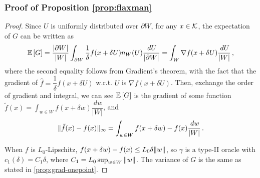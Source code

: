 
\subsubsection*{Proof of Proposition \ref{prop:flaxman}}
\begin{proof}
Since $U$ is uniformly distributed over $\partial W$, for any $x \in \mathcal{K}$, the expectation of $G$ can be written as
\begin{align*}
\mathbb{E}\left[G\right] =\dfrac{\lvert \partial W\rvert}{\lvert W \rvert} \int_{\partial W} \dfrac{1}{\delta} f(x+\delta U)n_W(U)\dfrac{\,d U}{\lvert \partial W\rvert}
=  \int_W \nabla f(x+\delta U)\dfrac{\,d U}{\lvert W\rvert}\,,
\end{align*}
where the second equality follows from Gradient's theorem, with the fact that the gradient of $\hat{f} =\dfrac{1}{\delta} f(x+\delta U) $ w.r.t. $U$ is $\nabla f(x+\delta U)$. Then, exchange the order of gradient and integral, we can see $\mathbb{E}\left[G\right]$ is the gradient of some function
$\tilde{f}(x) =\int_{w \in W} f(x+\delta w)\dfrac{\,d w}{\lvert W\rvert} $, and 
\[
\|\tilde{f}(x)-f(x)\|_\infty =\int_{w \in W} f(x+\delta w)-f(x)\dfrac{\,d w}{\lvert W\rvert} \,.
\]

When $f$ is $L_0$-Lipschitz, $f(x+\delta w)-f(x) \le L_0\delta \|w\|$, so $\gamma$ is a type-II oracle with $c_1(\delta) = C_1 \delta$, where $C_1 = L_0 \sup_{w\in W}\|w\|$.
The variance of $G$ is the same as stated in \cref{prop:grad-onepoint}.
\end{proof}


